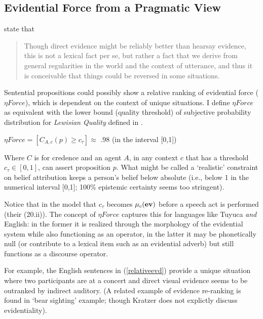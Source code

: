\documentclass[11pt]{article}
\begin{document}
\subsection{Evidential Force from a Pragmatic View}
 state that

\begin{quote}
Though direct evidence might be reliably better than hearsay evidence, this is not a lexical fact per se, but rather a fact that we derive from general regularities in the world and the context of utterance, and thus it is conceivable that things could be reversed in some situations.
\end{quote}

Sentential propositions could possibly show a relative ranking of evidential force ($\eta Force$), which is dependent on the context of unique situations. I define $\eta Force$ as equivalent with the lower bound (quality threshold) of subjective probability distribution for {\sl Lewisian Quality} defined in .

\begin{exe}
\ex $\eta Force = [C_{A,c}(p) \geq c_{\tau}] \approx$ .98 (in the interval [0,1])
\end{exe}

Where $C$ is for credence and an agent $A$, in any context $c$ that has a threshold $c_{\tau} \in [0,1]$, can assert proposition $p$. What might be called a `realistic' constraint on belief attribution keeps a person's belief below absolute (i.e., below 1 in the numerical interval [0,1]; 100\% epistemic certainty seems too stringent).

Notice that in the  model that $c_{\tau}$ becomes $\mu_{c}{\bf (ev)}$ before a speech act is performed (their (20.ii)). The concept of $\eta Force$ captures this for languages like Tuyuca {\sl and} English: in the former it is realized through the morphology of the evidential system while also functioning as an operator, in the latter it may be phonetically null (or contribute to a lexical item such as an evidential adverb) but still functions as a discourse operator.
 
For example, the English sentences in (\ref{relativeevd}) provide a unique situation where two participants are at a concert and direct visual evidence seems to be outranked by indirect auditory. (A related example of evidence re-ranking is found in  `bear sighting' example; though Kratzer does not explictly discuss evidentiality).
\end{document}
